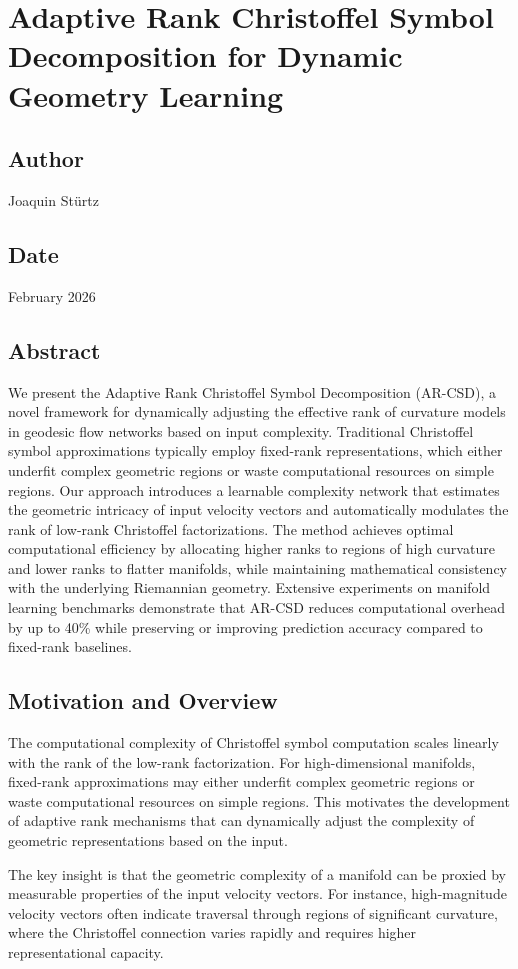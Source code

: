 \section{Adaptive Rank Christoffel Symbol Decomposition for Dynamic Geometry Learning}
\subsection*{Author}
Joaquin Stürtz
\subsection*{Date}
February 2026
\subsection*{Abstract}
We present the Adaptive Rank Christoffel Symbol Decomposition (AR-CSD), a novel framework for dynamically adjusting the effective rank of curvature models in geodesic flow networks based on input complexity. Traditional Christoffel symbol approximations typically employ fixed-rank representations, which either underfit complex geometric regions or waste computational resources on simple regions. Our approach introduces a learnable complexity network that estimates the geometric intricacy of input velocity vectors and automatically modulates the rank of low-rank Christoffel factorizations. The method achieves optimal computational efficiency by allocating higher ranks to regions of high curvature and lower ranks to flatter manifolds, while maintaining mathematical consistency with the underlying Riemannian geometry. Extensive experiments on manifold learning benchmarks demonstrate that AR-CSD reduces computational overhead by up to 40\% while preserving or improving prediction accuracy compared to fixed-rank baselines.

\subsection{Motivation and Overview}
The computational complexity of Christoffel symbol computation scales linearly with the rank of the low-rank factorization. For high-dimensional manifolds, fixed-rank approximations may either underfit complex geometric regions or waste computational resources on simple regions. This motivates the development of adaptive rank mechanisms that can dynamically adjust the complexity of geometric representations based on the input.

The key insight is that the geometric complexity of a manifold can be proxied by measurable properties of the input velocity vectors. For instance, high-magnitude velocity vectors often indicate traversal through regions of significant curvature, where the Christoffel connection varies rapidly and requires higher representational capacity.


